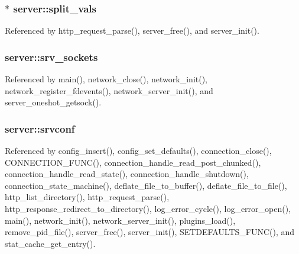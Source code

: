 \hypertarget{structserver_a3b9fc9aa87a4aad91d151c8639020418}{
\subsubsection[{split\-\_\-vals}]{$\ast$ server\-::split\-\_\-vals}}\label{structserver_a3b9fc9aa87a4aad91d151c8639020418}


Referenced by http\-\_\-request\-\_\-parse(), server\-\_\-free(), and server\-\_\-init().

\hypertarget{structserver_ab1a5109e0d0f8a13596bbb2e322e5dea}{
\subsubsection[{srv\-\_\-sockets}]{ server\-::srv\-\_\-sockets}}\label{structserver_ab1a5109e0d0f8a13596bbb2e322e5dea}


Referenced by main(), network\-\_\-close(), network\-\_\-init(), network\-\_\-register\-\_\-fdevents(), network\-\_\-server\-\_\-init(), and server\-\_\-oneshot\-\_\-getsock().

\hypertarget{structserver_a4cea52b35e252e24d75e3a298a0146e6}{
\subsubsection[{srvconf}]{ server\-::srvconf}}\label{structserver_a4cea52b35e252e24d75e3a298a0146e6}


Referenced by config\-\_\-insert(), config\-\_\-set\-\_\-defaults(), connection\-\_\-close(), C\-O\-N\-N\-E\-C\-T\-I\-O\-N\-\_\-\-F\-U\-N\-C(), connection\-\_\-handle\-\_\-read\-\_\-post\-\_\-chunked(), connection\-\_\-handle\-\_\-read\-\_\-state(), connection\-\_\-handle\-\_\-shutdown(), connection\-\_\-state\-\_\-machine(), deflate\-\_\-file\-\_\-to\-\_\-buffer(), deflate\-\_\-file\-\_\-to\-\_\-file(), http\-\_\-list\-\_\-directory(), http\-\_\-request\-\_\-parse(), http\-\_\-response\-\_\-redirect\-\_\-to\-\_\-directory(), log\-\_\-error\-\_\-cycle(), log\-\_\-error\-\_\-open(), main(), network\-\_\-init(), network\-\_\-server\-\_\-init(), plugins\-\_\-load(), remove\-\_\-pid\-\_\-file(), server\-\_\-free(), server\-\_\-init(), S\-E\-T\-D\-E\-F\-A\-U\-L\-T\-S\-\_\-\-F\-U\-N\-C(), and stat\-\_\-cache\-\_\-get\-\_\-entry().

